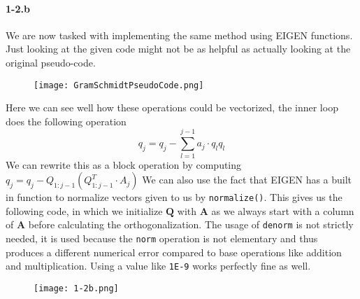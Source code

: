 \documentclass{article}
\begin{document}
\paragraph{1-2.b} 
We are now tasked with implementing the same method using EIGEN functions. Just looking at the given code might not be as helpful as actually looking at the original pseudo-code. 
\begin{figure}[!hbt]
    \centering
\texttt{[image: GramSchmidtPseudoCode.png]}
\end{figure}
\noindent Here we can see well how these operations could be vectorized, the inner loop does the following operation
\begin{equation*}
    q_{j} = q_{j} - \sum_{l=1}^{j-1} a_{j}\cdot q_{l} q_{l}
\end{equation*}
We can rewrite this as a block operation by computing $q_{j} =  q_{j} - Q_{1:j-1}\left(Q_{1:j-1}^{T} \cdot A_{j}\right) $ We can also use the fact that EIGEN has a built in function to normalize vectors given to us by \verb|normalize()|. This gives us the following code, in which we initialize $\mathbf{Q}$ with $\mathbf{A}$ as we always start with a column of $\mathbf{A}$ before calculating the orthogonalization. The usage of \verb|denorm| is not strictly needed, it is used because the \verb|norm| operation is not elementary and thus produces a different numerical error compared to base operations like addition and multiplication. Using a value like \verb|1E-9| works perfectly fine as well.
\begin{figure}[!hbt]
    \centering
\texttt{[image: 1-2b.png]}
\end{figure}

\pagebreak
\end{document}
